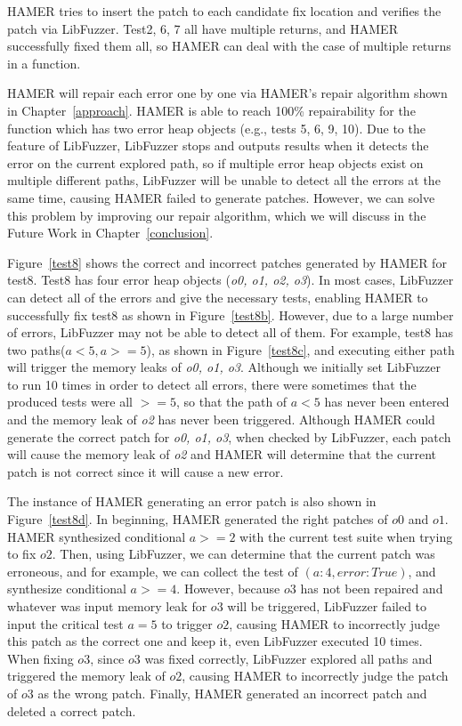 \documentclass[a4paper,11pt,oneside,openany]{book}
\begin{document}
HAMER tries to insert the patch to each candidate fix location and verifies the patch via LibFuzzer. Test2, 6, 7 all have multiple returns, and HAMER successfully fixed them all, so HAMER can deal with the case of multiple returns in a function.

HAMER will repair each error one by one via HAMER's repair algorithm shown in Chapter~\ref{approach}. HAMER is able to reach 100\% repairability for the function which has two error heap objects (e.g., tests 5, 6, 9, 10). Due to the feature of LibFuzzer, LibFuzzer stops and outputs results when it detects the error on the current explored path, so if multiple error heap objects exist on multiple different paths, LibFuzzer will be unable to detect all the errors at the same time, causing HAMER failed to generate patches. However, we can solve this problem by improving our repair algorithm, which we will discuss in the Future Work in Chapter~\ref{conclusion}.

Figure~\ref{test8} shows the correct and incorrect patches generated by HAMER for test8. Test8 has four error heap objects ({\it o0, o1, o2, o3}). In most cases, LibFuzzer can detect all of the errors and give the necessary tests, enabling HAMER to successfully fix test8 as shown in Figure~\ref{test8b}. However, due to a large number of errors, LibFuzzer may not be able to detect all of them. For example, test8 has two paths($a<5, a>=5$), as shown in Figure~\ref{test8c}, and executing either path will trigger the memory leaks of {\it o0, o1, o3}. Although we initially set LibFuzzer to run 10 times in order to detect all errors, there were sometimes that the produced tests were all $>=5$, so that the path of $a<5$ has never been entered and the memory leak of {\it o2} has never been triggered. Although HAMER could generate the correct patch for {\it o0, o1, o3}, when checked by LibFuzzer, each patch will cause the memory leak of {\it o2} and HAMER will determine that the current patch is not correct since it will cause a new error.

The instance of HAMER generating an error patch is also shown in Figure~\ref{test8d}. In beginning, HAMER generated the right patches of $o0$ and $o1$. HAMER synthesized conditional $a>=2$ with the current test suite when trying to fix $o2$. Then, using LibFuzzer, we can determine that the current patch was erroneous, and for example, we can collect the test of $(a: 4, error: True)$, and synthesize conditional $a>=4$. However, because $o3$ has not been repaired and whatever was input memory leak for $o3$ will be triggered, LibFuzzer failed to input the critical test $a=5$ to trigger $o2$, causing HAMER to incorrectly judge this patch as the correct one and keep it, even LibFuzzer executed 10 times. When fixing $o3$, since $o3$ was fixed correctly, LibFuzzer explored all paths and triggered the memory leak of $o2$, causing HAMER to incorrectly judge the patch of $o3$ as the wrong patch. Finally, HAMER generated an incorrect patch and deleted a correct patch.
\end{document}
